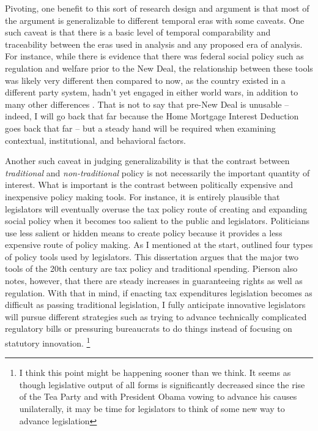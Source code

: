 \documentclass[12pt]{article}
\begin{document}
Pivoting, one benefit to this sort of research design and argument is that most of the argument is generalizable to different temporal eras with some caveats. One such caveat is that there is a basic level of temporal comparability and traceability between the eras used in analysis and any proposed era of analysis. For instance, while there is evidence that there was federal social policy such as regulation and welfare prior to the New Deal, the relationship between these tools was likely very different then compared to now, as the country existed in a different party system, hadn't yet engaged in either world wars, in addition to many other differences \citep{skocpol1995, balogh2009}. That is not to say that pre-New Deal is unusable -- indeed, I will go back that far because the Home Mortgage Interest Deduction goes back that far -- but a steady hand will be required when examining contextual, institutional, and behavioral factors.

Another such caveat in judging generalizability is that the contrast between \emph{traditional} and \emph{non-traditional} policy is not necessarily the important quantity of interest. What is important is the contrast between politically expensive and inexpensive policy making tools. For instance, it is entirely plausible that legislators will eventually overuse the tax policy route of creating and expanding social policy when it becomes too salient to the public and legislators. Politicians use less salient or hidden means to create policy because it provides a less expensive route of policy making. As I mentioned at the start, \cite{pierson2007} outlined four types of policy tools used by legislators. This dissertation argues that the major two tools of the 20th century are tax policy and traditional spending. Pierson also notes, however, that there are steady increases in guaranteeing rights as well as regulation. With that in mind, if enacting tax expenditures legislation becomes as difficult as passing traditional legislation, I fully anticipate innovative legislators will pursue different strategies such as trying to advance technically complicated regulatory bills or pressuring bureaucrats to do things instead of focusing on statutory innovation. \footnote{I think this point might be happening sooner than we think. It seems as though legislative output of all forms is significantly decreased since the rise of the Tea Party and with President Obama vowing to advance his causes unilaterally, it may be time for legislators to think of some new way to advance legislation} 
\end{document}
